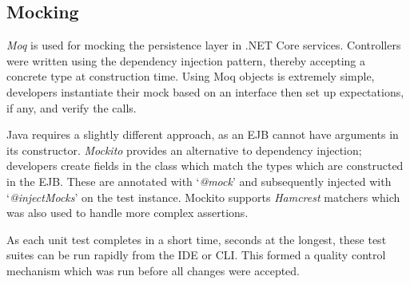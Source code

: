 \subsection{Mocking}
\par
\textit{Moq}\cite{Moq} is used for mocking the persistence layer in .NET Core services. Controllers were written using the dependency injection pattern, thereby accepting a concrete type at construction time. Using Moq objects is extremely simple, developers instantiate their mock based on an interface then set up expectations, if any, and verify the calls.

\par
Java requires a slightly different approach, as an EJB cannot have arguments in its constructor. \textit{Mockito}\cite{Mockito} provides an alternative to dependency injection; developers create fields in the class which match the  types which are constructed in the EJB. These are annotated with `\textit{@mock}' and subsequently injected with `\textit{@injectMocks}' on the test instance. Mockito supports \textit{Hamcrest}\cite{Hamcrest} matchers which was also used to handle more complex assertions.

\par
As each unit test completes in a short time, seconds at the longest, these test suites can be run rapidly from the IDE or CLI. This formed a quality control mechanism which was run before all changes were accepted.
